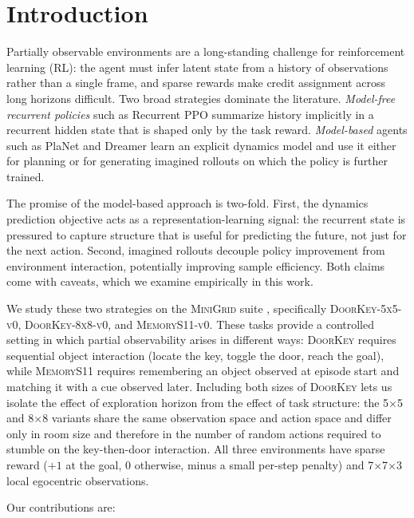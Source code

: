 \documentclass[letterpaper]{article}
\begin{document}
\section{Introduction}

Partially observable environments are a long-standing challenge for
reinforcement learning (RL): the agent must infer latent state from a history
of observations rather than a single frame, and sparse rewards make credit
assignment across long horizons difficult. Two broad strategies dominate the
literature. \emph{Model-free recurrent policies} such as Recurrent PPO
\cite{schulman2017ppo} summarize history implicitly in a recurrent hidden
state that is shaped only by the task reward. \emph{Model-based} agents such
as PlaNet \cite{hafner2019planet} and Dreamer \cite{hafner2020dreamer} learn
an explicit dynamics model and use it either for planning or for generating
imagined rollouts on which the policy is further trained.

The promise of the model-based approach is two-fold. First, the dynamics
prediction objective acts as a representation-learning signal: the recurrent
state is pressured to capture structure that is useful for predicting the
future, not just for the next action. Second, imagined rollouts decouple
policy improvement from environment interaction, potentially improving sample
efficiency. Both claims come with caveats, which we examine empirically in
this work.

We study these two strategies on the \textsc{MiniGrid} suite
\cite{minigrid}, specifically \textsc{DoorKey-5x5-v0},
\textsc{DoorKey-8x8-v0}, and \textsc{MemoryS11-v0}. These tasks provide a
controlled setting in which partial observability arises in different ways:
\textsc{DoorKey} requires sequential object interaction (locate the key,
toggle the door, reach the goal), while \textsc{MemoryS11} requires
remembering an object observed at episode start and matching it with a cue
observed later. Including both sizes of \textsc{DoorKey} lets us isolate
the effect of exploration horizon from the effect of task structure: the
5$\times$5 and 8$\times$8 variants share the same observation space and
action space and differ only in room size and therefore in the number of
random actions required to stumble on the key-then-door interaction. All
three environments have sparse reward ($+1$ at the goal, $0$ otherwise,
minus a small per-step penalty) and 7$\times$7$\times$3 local egocentric
observations.

Our contributions are:
\end{document}
